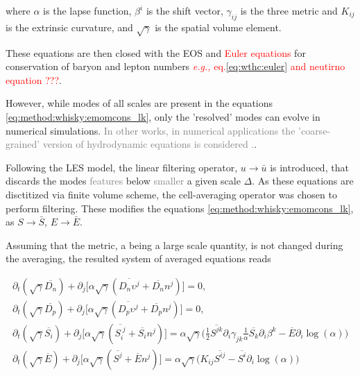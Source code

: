 \documentclass[11pt,a4paper,headinclude=true,DIV=14,BCOR=8mm,chapterprefix,listof=totoc,twoside,openright,abstracton]{scrbook}
\newcommand{\red}[1]{\textcolor{red}{#1}}
\newcommand{\gray}[1]{\textcolor{gray}{#1}}
\begin{document}
where $\alpha$ is the lapse function, $\beta^i$ is the shift vector, $\gamma_{ij}$ is the three metric and $K_{ij}$ is the extrinsic curvature, and $\sqrt{\gamma}$ is the spatial volume element.

These equations are then closed with the EOS and \red{Euler equations} for conservation of baryon and 
lepton numbers \red{\textit{e.g.,} eq.\eqref{eq:wthc:euler} and neutirno equation ???}.

However, while modes of all scales are present in the equations \eqref{eq:method:whisky:emomcons_lk}, 
only the 'resolved' modes can evolve in numerical simulations. 
\gray{In other works, in numerical applications the 'coarse-grained' version of hydrodynamic equations
is considered \cite{Radice:2017zta}.}.

Following the LES model, the linear filtering operator, $u\rightarrow \bar{u}$ is introduced, that 
discards the modes \gray{features} below \gray{smaller} a given scale $\Delta$.
As these equations are disctitized via finite volume scheme, the cell-averaging operator was chosen to
perform filtering. These modifies the equations \eqref{eq:method:whisky:emomcons_lk}, as
$S\rightarrow\bar{S}$, $E\rightarrow\bar{E}$.

Assuming that the metric, a being a large scale quantity, is not changed during the averaging, the resulted system of averaged equations reads \cite{Radice:2017zta}

\begin{eqnarray}
    \label{eq:method:whisky:emomcons_lk_filt}
    \partial_t(\sqrt{\gamma}\overline{D_n}) + \partial_j\Big[ \alpha\sqrt{\gamma}(\overline{D_n\upsilon^j} + \overline{D_n}n^j) \Big] = 0, \\
    \partial_t(\sqrt{\gamma}\overline{D_p}) + \partial_j\Big[ \alpha\sqrt{\gamma}(\overline{D_p\upsilon^j} + \overline{D_p}n^j) \Big] = 0, \\
    \partial_t(\sqrt{\gamma}\overline{S_i}) + \partial_j\Big[ \alpha \sqrt{\gamma} (\overline{S_i^{\; j}} + \overline{S_i} n^j) \Big] = 
    \alpha \sqrt{\gamma}\Big( \frac{1}{2} \overline{S^{jk}} \partial_i \gamma_{jk} \frac{1}{\alpha} \overline{S_k} \partial_i \beta^k - \overline{E}\partial_i \log(\alpha) \Big) \\
    \partial_t(\sqrt{\gamma}\overline{E}) + \partial_j\Big[ \alpha \sqrt{\gamma} (\overline{S^{j}} + \overline{E} n^j) \Big] = 
    \alpha \sqrt{\gamma}\Big( K_{ij}\overline{S^{ij}} - \overline{S^i}\partial_i \log(\alpha) \Big) 
\end{eqnarray}
\end{document}
